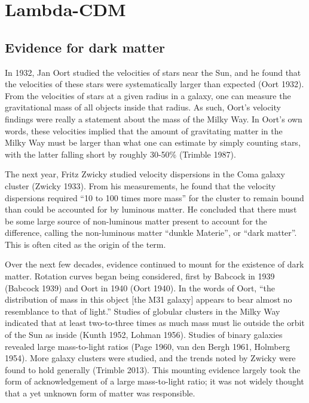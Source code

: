 \hypertarget{lambda-cdm}{%
\chapter{Lambda-CDM}\label{lambda-cdm}}

\hypertarget{evidence-for-dark-matter}{%
\section{Evidence for dark matter}\label{evidence-for-dark-matter}}

In 1932, Jan Oort studied the velocities of stars near the Sun, and he
found that the velocities of these stars were systematically larger than
expected (Oort 1932). From the velocities of stars at a given radius in
a galaxy, one can measure the gravitational mass of all objects inside
that radius. As such, Oort's velocity findings were really a statement
about the mass of the Milky Way. In Oort's own words, these velocities
implied that the amount of gravitating matter in the Milky Way must be
larger than what one can estimate by simply counting stars, with the
latter falling short by roughly 30-50\% (Trimble 1987).

The next year, Fritz Zwicky studied velocity dispersions in the Coma
galaxy cluster (Zwicky 1933). From his measurements, he found that the
velocity dispersions required ``10 to 100 times more mass'' for the
cluster to remain bound than could be accounted for by luminous matter.
He concluded that there must be some large source of non-luminous matter
present to account for the difference, calling the non-luminous matter
``dunkle Materie'', or ``dark matter''. This is often cited as the
origin of the term.

Over the next few decades, evidence continued to mount for the existence
of dark matter. Rotation curves began being considered, first by Babcock
in 1939 (Babcock 1939) and Oort in 1940 (Oort 1940). In the words of
Oort, ``the distribution of mass in this object {[}the M31 galaxy{]}
appears to bear almost no resemblance to that of light.'' Studies of
globular clusters in the Milky Way indicated that at least two-to-three
times as much mass must lie outside the orbit of the Sun as inside
(Kunth 1952, Lohman 1956). Studies of binary galaxies revealed large
mass-to-light ratios (Page 1960, van den Bergh 1961, Holmberg 1954).
More galaxy clusters were studied, and the trends noted by Zwicky were
found to hold generally (Trimble 2013). This mounting evidence largely
took the form of acknowledgement of a large mass-to-light ratio; it was
not widely thought that a yet unknown form of matter was responsible.

